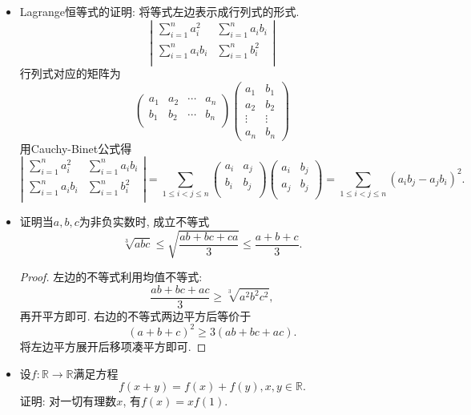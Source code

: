\documentclass[UTF8,11pt, a4paper, oneside, fontset=none]{ctexbook}
\begin{document}
\begin{itemize}
\item Lagrange恒等式的证明: 将等式左边表示成行列式的形式.
\[
\left | \begin{matrix}
\sum_{i=1}^n a_i^2 & \sum_{i=1}^n a_i b_i  \\
\sum_{i=1}^n a_i b_i & \sum_{i=1}^n b_i^2 \\
\end{matrix} \right |
\]
行列式对应的矩阵为
\[
\left ( \begin{matrix}
a_1 & a_2 & \cdots & a_n \\
b_1 & b_2 & \cdots & b_n \\
\end{matrix} \right ) 
\left ( \begin{matrix}
a_1 & b_1 \\
a_2 & b_2 \\
\vdots & \vdots \\
a_n & b_n
\end{matrix} \right )
\]
用Cauchy-Binet公式得
\[
\left | \begin{matrix}
\sum_{i=1}^n a_i^2 & \sum_{i=1}^n a_i b_i  \\
\sum_{i=1}^n a_i b_i & \sum_{i=1}^n b_i^2 \\
\end{matrix} \right |
= \sum_{1 \leq i < j \leq n} \left ( \begin{matrix}
a_i & a_j  \\
b_i & b_j  \\
\end{matrix} \right ) \left ( \begin{matrix}
a_i & b_j  \\
a_j & b_j  \\
\end{matrix} \right )  =  \sum_{1 \leq i < j \leq n}(a_i b_j - a_j b_i)^2.
\]

\item 证明当$a, b, c$为非负实数时, 成立不等式
\[
\sqrt[3]{abc} \leq \sqrt{\frac{ab + bc + ca}{3}} \leq \frac{a+b+c}{3}.
\]

\begin{proof}
左边的不等式利用均值不等式:
\[
\frac{ab+bc+ac}{3} \geq \sqrt[3]{a^2 b^2 c^2},
\]
再开平方即可. 右边的不等式两边平方后等价于
\[
(a+b+c)^2 \geq 3(ab+bc+ac).
\]
将左边平方展开后移项凑平方即可.
\end{proof}

\item 设$f : \mathbb R \to \mathbb R$满足方程
\[
f(x + y) = f(x) + f(y), x, y \in \mathbb R.
\]
证明: 对一切有理数$x$, 有$f(x) = xf(1)$.


\end{itemize}
\end{document}

